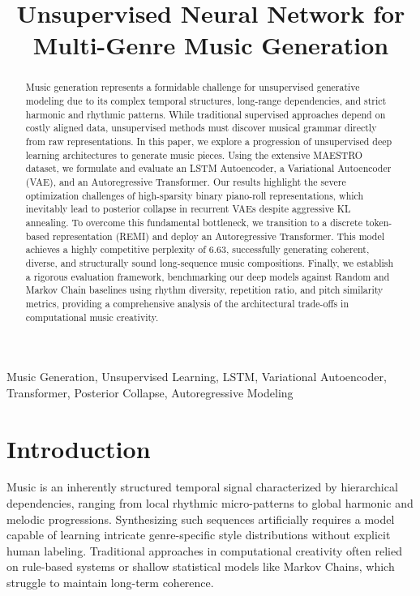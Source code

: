 \documentclass[conference]{IEEEtran}
\begin{document}
\title{Unsupervised Neural Network for Multi-Genre Music Generation}

\author{
}

\maketitle

\begin{abstract}

Music generation represents a formidable challenge for unsupervised generative modeling due to its complex temporal structures, long-range dependencies, and strict harmonic and rhythmic patterns. While traditional supervised approaches depend on costly aligned data, unsupervised methods must discover musical grammar directly from raw representations. In this paper, we explore a progression of unsupervised deep learning architectures to generate music pieces. Using the extensive MAESTRO dataset, we formulate and evaluate an LSTM Autoencoder, a Variational Autoencoder (VAE), and an Autoregressive Transformer. Our results highlight the severe optimization challenges of high-sparsity binary piano-roll representations, which inevitably lead to posterior collapse in recurrent VAEs despite aggressive KL annealing. To overcome this fundamental bottleneck, we transition to a discrete token-based representation (REMI) and deploy an Autoregressive Transformer. This model achieves a highly competitive perplexity of 6.63, successfully generating coherent, diverse, and structurally sound long-sequence music compositions. Finally, we establish a rigorous evaluation framework, benchmarking our deep models against Random and Markov Chain baselines using rhythm diversity, repetition ratio, and pitch similarity metrics, providing a comprehensive analysis of the architectural trade-offs in computational music creativity.
\end{abstract}

\begin{IEEEkeywords}
Music Generation, Unsupervised Learning, LSTM, Variational Autoencoder, Transformer, Posterior Collapse, Autoregressive Modeling
\end{IEEEkeywords}

\section{Introduction}
Music is an inherently structured temporal signal characterized by hierarchical dependencies, ranging from local rhythmic micro-patterns to global harmonic and melodic progressions. Synthesizing such sequences artificially requires a model capable of learning intricate genre-specific style distributions without explicit human labeling. Traditional approaches in computational creativity often relied on rule-based systems or shallow statistical models like Markov Chains, which struggle to maintain long-term coherence. 
\end{document}
